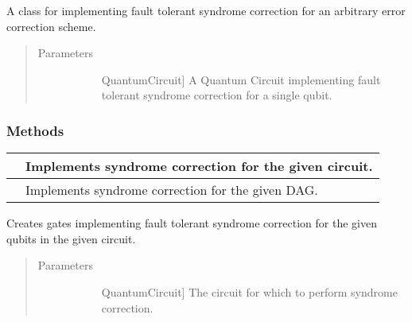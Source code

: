 \documentclass[letterpaper,10pt,english]{sphinxmanual}
\begin{document}
\begin{fulllineitems}
\label{\detokenize{Base:BaseFaultTolerance.SyndromeCorrector}}
A class for implementing fault tolerant syndrome correction for an arbitrary error correction scheme.
\begin{quote}\begin{description}
\item[{Parameters}] \leavevmode\begin{description}
\item[{}] \leavevmode{[}QuantumCircuit{]}
A Quantum Circuit implementing fault tolerant syndrome correction for a single qubit.

\end{description}

\end{description}\end{quote}
\subsubsection*{Methods}


\begin{savenotes}\sphinxattablestart
\centering
\begin{tabulary}{\linewidth}[t]{|T|T|}
\hline

&
Implements syndrome correction for the given circuit.
\\
\hline
{}
&
Implements syndrome correction for the given DAG.
\\
\hline
\end{tabulary}
\par
\sphinxattableend\end{savenotes}

\begin{fulllineitems}
\label{\detokenize{Base:BaseFaultTolerance.SyndromeCorrector.syndromeCorrectCircuit}}
Creates gates implementing fault tolerant syndrome correction for the given qubits in the given circuit.
\begin{quote}\begin{description}
\item[{Parameters}] \leavevmode\begin{description}
\item[{}] \leavevmode{[}QuantumCircuit{]}
The circuit for which to perform syndrome correction.


\end{description}
\end{description}
\end{quote}
\end{fulllineitems}
\end{fulllineitems}
\end{document}
